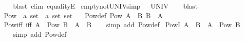 \begin{isabellebody}
%
\isadelimproof
\ \ %
\endisadelimproof
%
\isatagproof
{}\isamarkupfalse%
\ {\isacharparenleft}{\kern0pt}blast\ elim{\isacharcolon}{\kern0pt}\ equalityE{\isacharparenright}{\kern0pt}%
\endisatagproof
{\isafoldproof}%
%
\isadelimproof
\isanewline
%
\endisadelimproof
\isanewline
{}\isamarkupfalse%
\ empty{\isacharunderscore}{\kern0pt}not{\isacharunderscore}{\kern0pt}UNIV{\isacharbrackleft}{\kern0pt}simp{\isacharbrackright}{\kern0pt}{\isacharcolon}{\kern0pt}\ {\isachardoublequoteopen}{\isacharbraceleft}{\kern0pt}{\isacharbraceright}{\kern0pt}\ {\isasymnoteq}\ UNIV{\isachardoublequoteclose}\isanewline
%
\isadelimproof
\ \ %
\endisadelimproof
%
\isatagproof
{}\isamarkupfalse%
\ blast%
\endisatagproof
{\isafoldproof}%
%
\isadelimproof
%
\endisadelimproof
%
\isadelimdocument
%
\endisadelimdocument
%
\isatagdocument
%
\isamarkuptrue%
%
\endisatagdocument
{\isafolddocument}%
%
\isadelimdocument
%
\endisadelimdocument
{}\isamarkupfalse%
\ Pow\ {\isacharcolon}{\kern0pt}{\isacharcolon}{\kern0pt}\ {\isachardoublequoteopen}{\isacharprime}{\kern0pt}a\ set\ {\isasymRightarrow}\ {\isacharprime}{\kern0pt}a\ set\ set{\isachardoublequoteclose}\isanewline
\ \ \ Pow{\isacharunderscore}{\kern0pt}def{\isacharcolon}{\kern0pt}\ {\isachardoublequoteopen}Pow\ A\ {\isacharequal}{\kern0pt}\ {\isacharbraceleft}{\kern0pt}B{\isachardot}{\kern0pt}\ B\ {\isasymsubseteq}\ A{\isacharbraceright}{\kern0pt}{\isachardoublequoteclose}\isanewline
\isanewline
{}\isamarkupfalse%
\ Pow{\isacharunderscore}{\kern0pt}iff\ {\isacharbrackleft}{\kern0pt}iff{\isacharbrackright}{\kern0pt}{\isacharcolon}{\kern0pt}\ {\isachardoublequoteopen}A\ {\isasymin}\ Pow\ B\ {\isasymlongleftrightarrow}\ A\ {\isasymsubseteq}\ B{\isachardoublequoteclose}\isanewline
%
\isadelimproof
\ \ %
\endisadelimproof
%
\isatagproof
{}\isamarkupfalse%
\ {\isacharparenleft}{\kern0pt}simp\ add{\isacharcolon}{\kern0pt}\ Pow{\isacharunderscore}{\kern0pt}def{\isacharparenright}{\kern0pt}%
\endisatagproof
{\isafoldproof}%
%
\isadelimproof
\isanewline
%
\endisadelimproof
\isanewline
{}\isamarkupfalse%
\ PowI{\isacharcolon}{\kern0pt}\ {\isachardoublequoteopen}A\ {\isasymsubseteq}\ B\ {\isasymLongrightarrow}\ A\ {\isasymin}\ Pow\ B{\isachardoublequoteclose}\isanewline
%
\isadelimproof
\ \ %
\endisadelimproof
%
\isatagproof
{}\isamarkupfalse%
\ {\isacharparenleft}{\kern0pt}simp\ add{\isacharcolon}{\kern0pt}\ Pow{\isacharunderscore}{\kern0pt}def{\isacharparenright}{\kern0pt}%

\end{isabellebody}
